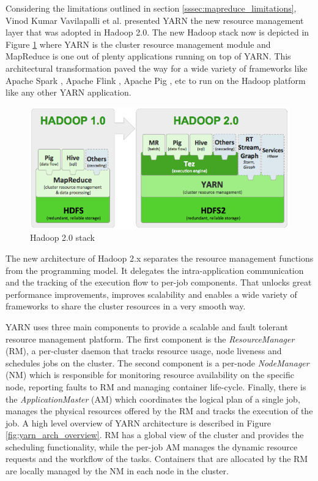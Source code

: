 Considering the limitations outlined in section
\ref{sssec:mapreduce_limitations}, Vinod Kumar Vavilapalli et
al. presented YARN \cite{Vavilapalli:2013:AHY:2523616.2523633} the new
resource management layer that was adopted in Hadoop 2.0. The new
Hadoop stack now is depicted in Figure \ref{fig:yarn_hadoop1_hadoop2_arch} where YARN is the
cluster resource management module and MapReduce is one out of plenty
applications running on top of YARN. This architectural transformation
paved the way for a wide variety of frameworks like
Apache Spark \cite{apache_spark}, Apache Flink \cite{apache_flink},
Apache Pig \cite{apache_pig}, etc to run on the
Hadoop platform like any other YARN application.

\begin{figure}
\centering
\includegraphics[scale=0.6]{resources/images/Background/hadoop1_hadoop2_arch.png}
\caption{Hadoop 2.0 stack \cite{hortonworks_hadoop_stack}}
\label{fig:yarn_hadoop1_hadoop2_arch}
\end{figure}

The new architecture of Hadoop 2.x separates the resource management
functions from the programming model. It delegates the
intra-application communication and the tracking of the execution flow
to per-job components. That unlocks great performance improvements,
improves scalability and enables a wide variety of frameworks to share
the cluster resources in a very smooth way.

YARN uses three main components to provide a scalable and fault
tolerant resource management platform. The first component is the
\emph{ResourceManager} (RM), a per-cluster daemon that tracks resource
usage, node liveness and schedules jobs on the cluster. The second
component is a per-node \emph{NodeManager} (NM) which is responsible
for monitoring resource availability on the specific node, reporting
faults to RM and managing container life-cycle. Finally, there is the
\emph{ApplicationMaster} (AM) which coordinates the logical plan of a
single job, manages the physical resources offered by the RM and
tracks the execution of the job. A high level overview of YARN
architecture is described in Figure \ref{fig:yarn_arch_overview}. RM
has a global view of the cluster and provides the scheduling
functionality, while the per-job AM manages the dynamic resource
requests and the workflow of the tasks. Containers that are allocated
by the RM are locally managed by the NM in each node in the cluster.

